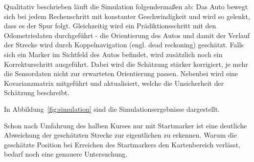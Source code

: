 Qualitativ beschrieben läuft die Simulation folgendermaßen ab:
Das Auto bewegt sich bei jedem Rechenschritt mit konstanter Geschwindigkeit und wird so gelenkt, dass es der Spur folgt. Gleichzeitig wird ein Prädiktionsschritt mit den Odometriedaten durchgeführt - die Orientierung des Autos und damit der Verlauf der Strecke wird durch Koppelnavigation (engl. dead reckoning) geschätzt.
Falls sich ein Marker im Sichtfeld des Autos befindet, wird zusätzlich noch ein Korrekturschritt ausgeführt. Dabei wird die Schätzung stärker korrigiert, je mehr die Sensordaten nicht zur erwarteten Orientierung passen. Nebenbei wird eine Kovarianzmatrix mitgeführt und aktualisiert, welche die Unsicherheit der Schätzung beschreibt.

In Abbildung~\ref{fig:simulation} sind die Simulationsergebnisse dargestellt.


Schon nach Umfahrung des halben Kurses nur mit Startmarker ist eine deutliche Abweichung der geschätzten Strecke zur eigentlichen zu erkennen. Warum die geschätzte Position bei Erreichen des Startmarkers den Kartenbereich verlässt, bedarf noch eine genauere Untersuchung.